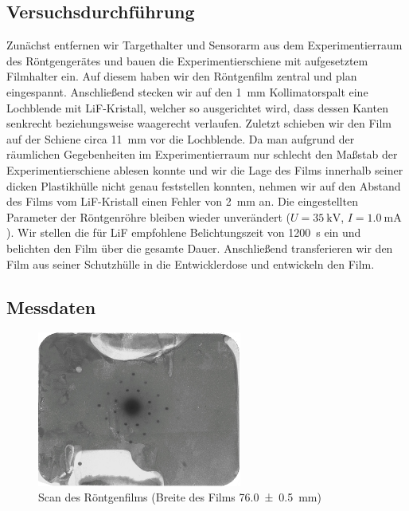 \documentclass[11pt, a4paper]{article}
\begin{document}
\subsection{Versuchsdurchführung}
Zunächst entfernen wir Targethalter und Sensorarm aus dem Experimentierraum des Röntgengerätes und bauen die Experimentierschiene mit aufgesetztem Filmhalter ein.
Auf diesem haben wir den Röntgenfilm zentral und plan eingespannt.
Anschließend stecken wir auf den \SI{1}{\milli\metre} Kollimatorspalt eine Lochblende mit LiF-Kristall, welcher so ausgerichtet wird, dass dessen Kanten senkrecht beziehungsweise waagerecht verlaufen.
Zuletzt schieben wir den Film auf der Schiene circa \SI{11}{\milli\metre} vor die Lochblende.
Da man aufgrund der räumlichen Gegebenheiten im Experimentierraum nur schlecht den Maßstab der Experimentierschiene ablesen konnte und wir die Lage des Films innerhalb seiner dicken Plastikhülle nicht genau feststellen konnten, nehmen wir auf den Abstand des Films vom LiF-Kristall einen Fehler von \SI{2}{\milli\metre} an.
Die eingestellten Parameter der Röntgenröhre bleiben wieder unverändert ($U = \SI{35}{\kilo\volt}$, $I = \SI{1,0}{\milli\ampere}$).
Wir stellen die für LiF empfohlene Belichtungszeit von \SI{1200}{\second} ein und belichten den Film über die gesamte Dauer.
Anschließend transferieren wir den Film aus seiner Schutzhülle in die Entwicklerdose und entwickeln den Film.

\subsection{Messdaten}
\begin{figure}[h!]
\centering
\includegraphics[width=0.60\textwidth]{./grafiken/film.pdf}
\caption{Scan des Röntgenfilms (Breite des Films \SI{76,0 +- 0,5}{\milli\metre})}
\label{fig:film}
\end{figure}
\end{document}
